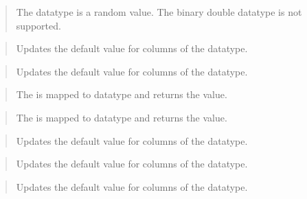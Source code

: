 \documentclass[letterpaper,10pt,english,openany,oneside]{sphinxmanual}
\begin{document}
\begin{quote}

The  datatype is a random value. The binary double datatype is not
supported.
\end{quote}

\begin{quote}

Updates the default value for columns of the  datatype.
\end{quote}

\begin{quote}

Updates the default value for columns of the  datatype.
\end{quote}

\begin{quote}

The  is mapped to  datatype and returns the  value.
\end{quote}

\begin{quote}

The  is mapped to  datatype and returns the 
value.
\end{quote}

\begin{quote}

Updates the default value for columns of the  datatype.
\end{quote}

\begin{quote}

Updates the default value for columns of the  datatype.
\end{quote}

\begin{quote}

Updates the default value for columns of the  datatype.
\end{quote}
\end{document}
